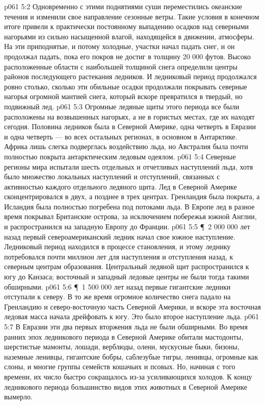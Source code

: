 \vs p061 5:2 Одновременно с этими поднятиями суши переместились океанские течения и изменили свое направление сезонные ветры. Такие условия в конечном итоге привели к практически постоянному выпадению осадков над северными нагорьями из сильно насыщенной влагой, находящейся в движении, атмосферы. На эти приподнятые, и потому холодные, участки начал падать снег, и он продолжал падать, пока его покров не достиг в толщину 20 000 футов. Высоко расположенные области с наибольшей толщиной снега определили центры районов последующего растекания ледников. И ледниковый период продолжался ровно столько, сколько эти обильные осадки продолжали покрывать северные нагорья огромной мантией снега, который вскоре превратился в твердый, но подвижный лед.
\vs p061 5:3 Огромные ледяные щиты этого периода все были расположены на возвышенных нагорьях, а не в гористых местах, где их находят сегодня. Половина ледников была в Северной Америке, одна четверть в Евразии и одна четверть --- во всех остальных регионах, в основном в Антарктике. Африка лишь слегка подверглась воздействию льда, но Австралия была почти полностью покрыта антарктическим ледовым одеялом.
\vs p061 5:4 Северные регионы мира испытали шесть отдельных и отчетливых наступлений льда, хотя было множество локальных наступлений и отступлений, связанных с активностью каждого отдельного ледяного щита. Лед в Северной Америке сконцентрировался в двух, а позднее в трех центрах. Гренландия была покрыта, а Исландия была полностью погребена под потоками льда. В Европе лед в разное время покрывал Британские острова, за исключением побережья южной Англии, и распространился на западную Европу до Франции.
\vs p061 5:5 \P\ 2 000 000 лет назад первый североамериканский ледник начал свое южное наступление. Ледниковый период находился в процессе становления, и этому леднику потребовался почти миллион лет для наступления и отступления назад, к северным центрам образования. Центральный ледяной щит распространился к югу до Канзаса; восточный и западный ледовые центры не были тогда такими обширными.
\vs p061 5:6 \P\ 1 500 000 лет назад первые гигантские ледники отступали к северу. В то же время огромное количество снега падало на Гренландию и северо\hyp{}восточную часть Северной Америки, и вскоре эта восточная ледовая масса начала дрейфовать к югу. Это было второе наступление льда.
\vs p061 5:7 В Евразии эти два первых вторжения льда не были обширными. Во время ранних эпох ледникового периода в Северной Америке обитали мастодонты, шерстистые мамонты, лошади, верблюды, олени, мускусные быки, бизоны, наземные ленивцы, гигантские бобры, саблезубые тигры, ленивцы, огромные как слоны, и многие группы семейств кошачьих и псовых. Но, начиная с того времени, их число быстро сокращалось из\hyp{}за усиливающихся холодов. К концу ледникового периода большинство видов этих животных в Северной Америке вымерло.
